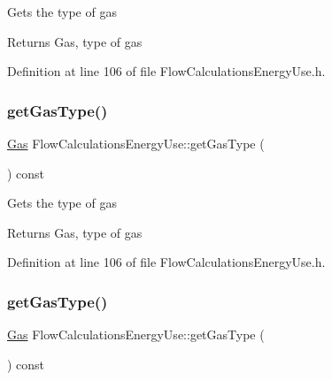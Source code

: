 Gets the type of gas

\begin{DoxyReturn}{Returns}
Gas, type of gas 
\end{DoxyReturn}


Definition at line 106 of file Flow\+Calculations\+Energy\+Use.\+h.

\mbox{\label{class_flow_calculations_energy_use_a04df0a0c655c4aef3d5a4539d57fec2e}} 
\subsubsection{\texorpdfstring{get\+Gas\+Type()}{getGasType()}\hspace{0.1cm}{\footnotesize\ttfamily [2/3]}}
{\footnotesize\ttfamily \hyperlink{class_flow_calculations_energy_use_a840d5a836e7b05d6791b79bace4440f2}{Gas} Flow\+Calculations\+Energy\+Use\+::get\+Gas\+Type (\begin{DoxyParamCaption}{ }\end{DoxyParamCaption}) const\hspace{0.3cm}{\ttfamily [inline]}}

Gets the type of gas

\begin{DoxyReturn}{Returns}
Gas, type of gas 
\end{DoxyReturn}


Definition at line 106 of file Flow\+Calculations\+Energy\+Use.\+h.

\mbox{\label{class_flow_calculations_energy_use_a04df0a0c655c4aef3d5a4539d57fec2e}} 
\subsubsection{\texorpdfstring{get\+Gas\+Type()}{getGasType()}\hspace{0.1cm}{\footnotesize\ttfamily [3/3]}}
{\footnotesize\ttfamily \hyperlink{class_flow_calculations_energy_use_a840d5a836e7b05d6791b79bace4440f2}{Gas} Flow\+Calculations\+Energy\+Use\+::get\+Gas\+Type (\begin{DoxyParamCaption}{ }\end{DoxyParamCaption}) const\hspace{0.3cm}{\ttfamily [inline]}}

